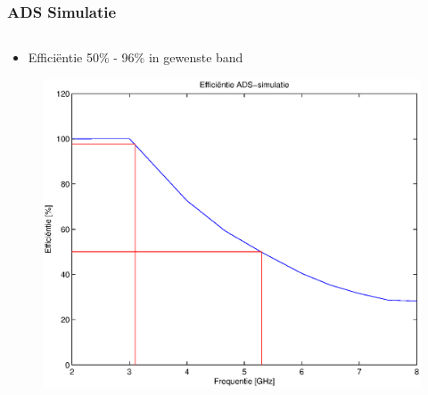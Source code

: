 \documentclass{beamer}
\begin{document}
  \begin{frame}
  \frametitle{ADS Simulatie}
    \begin{columns}[c]
      \begin{column}{0.5\textwidth}
      \begin{itemize}
        \item Effici\"entie 50\% - 96\% in gewenste band
      \end{itemize}
        \begin{figure}
          \includegraphics[width=\textwidth]{images/eff_ADS_sim.eps}
        \end{figure}

      \end{column}


\end{columns}
\end{frame}
\end{document}
